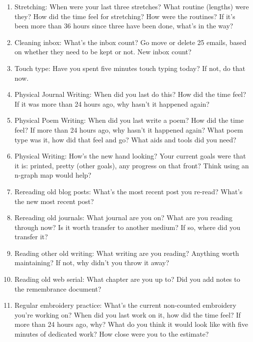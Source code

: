 \documentclass[12pt]{article}
\renewcommand{\,}{\textsuperscript{,}}
\begin{document}
\begin{enumerate}
\item Stretching: When were your last three stretches? What routine (lengths) were they? How did the time feel for stretching? How were the routines? If it's been more than 36 hours since three have been done, what's in the way?

\item Cleaning inbox: What's the inbox count? Go move or delete 25 emails, based on whether they need to be kept or not. New inbox count?

\item Touch type: Have you spent five minutes touch typing today? If not, do that now.

\item Physical Journal Writing: When did you last do this? How did the time feel? If it was more than 24 hours ago, why hasn't it happened again?

\item Physical Poem Writing: When did you last write a poem? How did the time feel? If more than 24 hours ago, why hasn't it happened again? What poem type was it, how did that feel and go? What aids and tools did you need?

\item Physical Writing: How's the new hand looking? Your current goals were that it is: printed, pretty (other goals), any progress on that front? Think using an n-graph map would help?

\item Rereading old blog posts: What's the most recent post you re-read? What's the new most recent post?

\item Rereading old journals: What journal are you on? What are you reading through now? Is it worth transfer to another medium? If so, where did you transfer it?

\item Reading other old writing: What writing are you reading? Anything worth maintaining? If not, why didn't you throw it away?

\item Reading old web serial: What chapter are you up to? Did you add notes to the remembrance document?

\item Regular embroidery practice: What's the current non-counted embroidery you're working on? When did you last work on it, how did the time feel? If more than 24 hours ago, why? What do you think it would look like with five minutes of dedicated work? How close were you to the estimate?


\end{enumerate}
\end{document}
